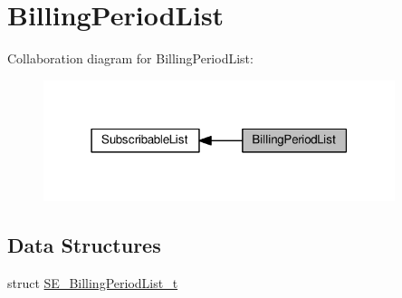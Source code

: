 \hypertarget{group__BillingPeriodList}{}\section{Billing\+Period\+List}
\label{group__BillingPeriodList}
Collaboration diagram for Billing\+Period\+List\+:\nopagebreak
\begin{figure}[H]
\begin{center}
\leavevmode
\includegraphics[width=291pt]{group__BillingPeriodList}
\end{center}
\end{figure}
\subsection*{Data Structures}
\begin{DoxyCompactItemize}
\item 
struct \hyperlink{structSE__BillingPeriodList__t}{S\+E\+\_\+\+Billing\+Period\+List\+\_\+t}
\end{DoxyCompactItemize}
